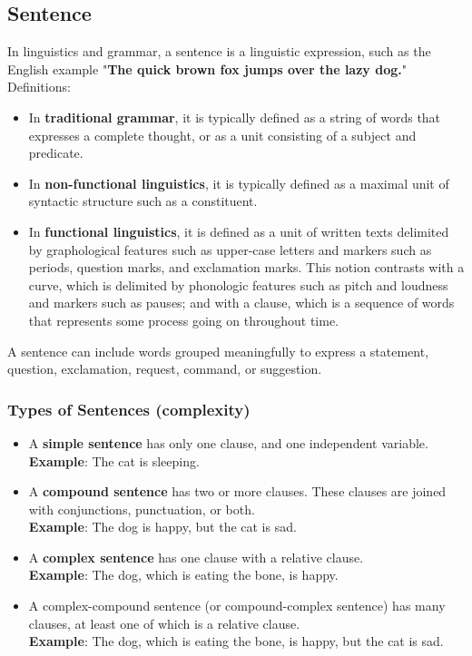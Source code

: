 \subsection{Sentence \cite{wiki-sentence-linguistics,wiki-sentence}}\label{Language: Sentence}
In linguistics and grammar, a sentence is a linguistic expression, such as the English example "\textbf{The quick brown fox jumps over the lazy dog.}" \\
Definitions:
\begin{itemize}
    \item In \textbf{traditional grammar}, it is typically defined as a string of words that expresses a complete thought, or as a unit consisting of a subject and predicate.
    \item In \textbf{non-functional linguistics}, it is typically defined as a maximal unit of syntactic structure such as a constituent.
    \item In \textbf{functional linguistics}, it is defined as a unit of written texts delimited by graphological features such as upper-case letters and markers such as periods, question marks, and exclamation marks. This notion contrasts with a curve, which is delimited by phonologic features such as pitch and loudness and markers such as pauses; and with a clause, which is a sequence of words that represents some process going on throughout time.
\end{itemize}

A sentence can include words grouped meaningfully to express a statement, question, exclamation, request, command, or suggestion.


\subsubsection{Types of Sentences (complexity)}
\begin{itemize}
    \item A \textbf{simple sentence} has only one clause, and one independent variable.\\ \textbf{Example}: The cat is sleeping.
    \item A \textbf{compound sentence} has two or more clauses. These clauses are joined with conjunctions, punctuation, or both.\\ \textbf{Example}: The dog is happy, but the cat is sad.
    \item A \textbf{complex sentence} has one clause with a relative clause. \\ \textbf{Example}: The dog, which is eating the bone, is happy.
    \item A complex-compound sentence (or compound-complex sentence) has many clauses, at least one of which is a relative clause.\\ \textbf{Example}: The dog, which is eating the bone, is happy, but the cat is sad.
\end{itemize}

